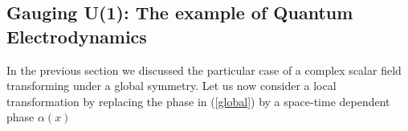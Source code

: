 \documentclass[12pt]{article}
\begin{document}


\subsection{Gauging U(1): The example of Quantum Electrodynamics}

In the previous section we discussed the particular case of a complex scalar field transforming under a global symmetry.
%
%
%
%
%
Let us now consider a local transformation by replacing the phase in (\ref{global}) by a space-time dependent phase $\alpha (x)$
\end{document}
